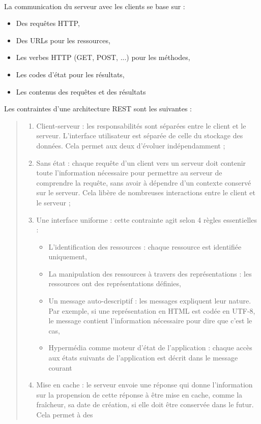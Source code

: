 \documentclass{report}
\begin{document}
\paragraph{}
La communication du serveur avec les clients se base sur : 
\begin{itemize}
\item Des requêtes HTTP,
\item Des URLs pour les ressources,
\item Les verbes HTTP (GET, POST, ...) pour les méthodes,
\item Les codes d'état pour les résultats,
\item Les contenus des requêtes et des résultats 
\end{itemize}

Les contraintes
d'une architecture REST sont les suivantes :
\begin{quotation}
  \noindent
\begin{enumerate}
\item Client-serveur : les responsabilités sont séparées entre le client et le serveur. L'interface utilisateur est séparée de
celle du stockage des données. Cela permet aux deux d'évoluer indépendamment ;
\item Sans état : chaque requête d'un client vers un serveur doit contenir toute l'information nécessaire pour permettre 
au serveur de comprendre la requête, sans avoir à dépendre d'un contexte conservé sur le serveur. Cela libère de 
nombreuses interactions entre le client et le serveur ;
\item Une interface uniforme : cette contrainte agit selon 4 règles essentielles :
    \begin{itemize}
    \item L'identification des ressources : chaque ressource est identifiée uniquement,
    \item La manipulation des ressources à travers des représentations : les ressources ont des représentations définies,
    \item Un message auto-descriptif : les messages expliquent leur nature. Par exemple, si une représentation en HTML 
    est codée en UTF-8, le message contient l'information nécessaire pour dire que c'est le cas,
    \item Hypermédia comme moteur d'état de l'application : chaque accès aux états suivants de l'application est décrit 
     dans le message courant
    \end{itemize}
\item Mise en cache : le serveur envoie une réponse qui donne l'information sur la propension de cette réponse à être mise en cache, comme la fraîcheur, sa date de création, si elle doit être conservée dans le futur. Cela permet à des

\end{enumerate}
\end{quotation}
\end{document}
